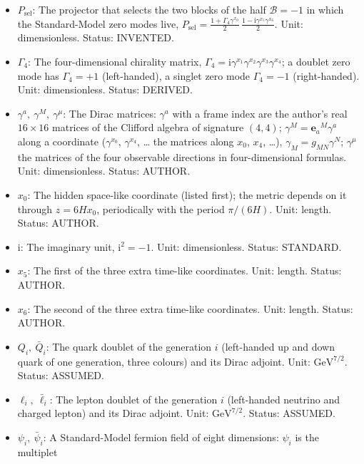 \documentclass[
  10pt,
]{article}
\providecommand{\tightlist}{%
  \setlength{\itemsep}{0pt}\setlength{\parskip}{0pt}}
\begin{document}
\begin{itemize}
\tightlist
\item
  \(P_{\mathrm{sel}}\): The projector that selects the two blocks of the
  half \(\mathcal{B} = -1\) in which the Standard-Model zero modes live,
  \(P_{\mathrm{sel}} = \frac{1 + \Gamma_4\gamma^{x_0}}{2}\,\frac{1 - \mathrm{i}\gamma^{x_5}\gamma^{x_6}}{2}\).
  Unit: dimensionless. Status: INVENTED.
\item
  \(\Gamma_4\): The four-dimensional chirality matrix,
  \(\Gamma_4 = \mathrm{i}\gamma^{x_1}\gamma^{x_2}\gamma^{x_3}\gamma^{x_4}\);
  a doublet zero mode has \(\Gamma_4 = +1\) (left-handed), a singlet
  zero mode \(\Gamma_4 = -1\) (right-handed). Unit: dimensionless.
  Status: DERIVED.
\item
  \(\gamma^a,\ \gamma^M,\ \gamma^\mu\): The Dirac matrices: \(\gamma^a\)
  with a frame index are the author's real \(16 \times 16\) matrices of
  the Clifford algebra of signature \((4, 4)\);
  \(\gamma^M = \mathbf{e}_a{}^M\gamma^a\) along a coordinate
  (\(\gamma^{x_0}\), \(\gamma^{x_4}\), \ldots{} the matrices along
  \(x_0\), \(x_4\), \ldots), \(\gamma_M = g_{MN}\gamma^N\);
  \(\gamma^\mu\) the matrices of the four observable directions in
  four-dimensional formulas. Unit: dimensionless. Status: AUTHOR.
\item
  \(x_0\): The hidden space-like coordinate (listed first); the metric
  depends on it through \(z = 6Hx_0\), periodically with the period
  \(\pi/(6H)\). Unit: length. Status: AUTHOR.
\item
  \(\mathrm{i}\): The imaginary unit, \(\mathrm{i}^2 = -1\). Unit:
  dimensionless. Status: STANDARD.
\item
  \(x_5\): The first of the three extra time-like coordinates. Unit:
  length. Status: AUTHOR.
\item
  \(x_6\): The second of the three extra time-like coordinates. Unit:
  length. Status: AUTHOR.
\item
  \(Q_i,\ \bar Q_i\): The quark doublet of the generation \(i\)
  (left-handed up and down quark of one generation, three colours) and
  its Dirac adjoint. Unit: \(\mathrm{GeV}^{7/2}\). Status: ASSUMED.
\item
  \(\ell_i,\ \bar\ell_i\): The lepton doublet of the generation \(i\)
  (left-handed neutrino and charged lepton) and its Dirac adjoint. Unit:
  \(\mathrm{GeV}^{7/2}\). Status: ASSUMED.
\item
  \(\psi_i,\ \bar\psi_i\): A Standard-Model fermion field of eight
  dimensions: \(\psi_i\) is the multiplet

\end{itemize}
\end{document}
